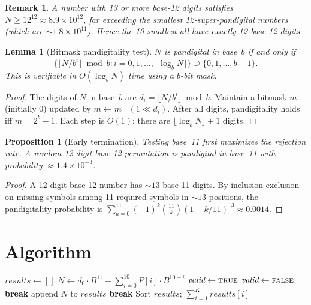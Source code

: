 \documentclass[12pt]{article}
\newtheorem{lemma}[theorem]{Lemma}
\newtheorem{proposition}[theorem]{Proposition}
\newtheorem*{remark}{Remark}
\begin{document}
\begin{remark}
A number with 13 or more base-12 digits satisfies $N \geq 12^{12} \approx 8.9 \times 10^{12}$, far exceeding the smallest 12-super-pandigital numbers (which are $\sim 1.8 \times 10^{11}$). Hence the 10 smallest all have exactly 12 base-12 digits.
\end{remark}

\begin{lemma}[Bitmask pandigitality test]\label{lem:bitmask}
$N$ is pandigital in base~$b$ if and only if
\[
\bigl\{\lfloor N/b^i \rfloor \bmod b : i = 0, 1, \ldots, \lfloor \log_b N \rfloor\bigr\} \supseteq \{0,1,\ldots,b-1\}.
\]
This is verifiable in $O(\log_b N)$ time using a $b$-bit mask.
\end{lemma}

\begin{proof}
The digits of $N$ in base~$b$ are $d_i = \lfloor N/b^i \rfloor \bmod b$. Maintain a bitmask $m$ (initially $0$) updated by $m \leftarrow m \mathbin{|} (1 \ll d_i)$. After all digits, pandigitality holds iff $m = 2^b - 1$. Each step is $O(1)$; there are $\lfloor \log_b N \rfloor + 1$ digits.
\end{proof}

\begin{proposition}[Early termination]\label{prop:early}
Testing base~11 first maximizes the rejection rate. A random 12-digit base-12 permutation is pandigital in base~11 with probability $\approx 1.4 \times 10^{-3}$.
\end{proposition}

\begin{proof}
A 12-digit base-12 number has $\sim 13$ base-11 digits. By inclusion-exclusion on missing symbols among 11 required symbols in $\sim 13$ positions, the pandigitality probability is $\sum_{k=0}^{11}(-1)^k\binom{11}{k}(1 - k/11)^{13} \approx 0.0014$.
\end{proof}

\section{Algorithm}

\begin{algorithmic}[1]
    \State $\textit{results} \gets []$
     
            \State $N \gets d_0 \cdot B^{11} + \sum_{i=0}^{10} P[i] \cdot B^{10-i}$
            \State $\textit{valid} \gets \textsc{true}$
             
                    \State $\textit{valid} \gets \textsc{false}$; \textbf{break}
                \EndIf
            \EndFor
             append $N$ to $\textit{results}$ \EndIf
        \EndFor
         \textbf{break} \EndIf
    \EndFor
    \State Sort $\textit{results}$; \Return $\sum_{i=1}^{K} \textit{results}[i]$
\EndFunction
\end{algorithmic}
\end{document}
